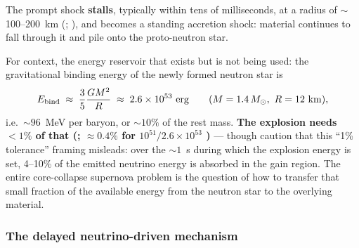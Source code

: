 The prompt shock \textbf{stalls}, typically within tens of milliseconds, at a
radius of $\sim$100--200~km (\citealt{janka2007}; \citealt{burrows2021}), and
becomes a standing accretion shock: material continues to fall through it and
pile onto the proto-neutron star.

For context, the energy reservoir that exists but is not being used: the
gravitational binding energy of the newly formed neutron star is
%
\begin{equation}
E_{\mathrm{bind}} \;\approx\; \frac{3}{5}\frac{GM^{2}}{R} \;\approx\; 2.6\times10^{53}\ \mathrm{erg}
\qquad (M = 1.4\,M_{\odot},\ R = 12\ \mathrm{km}),
\label{eq:ebind}
\end{equation}
%
i.e.\ $\sim 96$~MeV per baryon, or $\sim 10\%$ of the rest mass.
 \textbf{The explosion needs $< 1\%$ of that (\citealt{janka2007};
$\approx 0.4\%$ for $10^{51}/2.6 \times 10^{53}$ \derivedhere)} --- though
\citet{burrows2021} caution that this ``1\% tolerance'' framing misleads: over
the $\sim 1$~s during which the explosion energy is set, 4--10\% of the emitted
neutrino energy is absorbed in the gain region. The entire core-collapse
supernova problem is the question of how to transfer that small fraction of
the available energy from the neutron star to the overlying material.

\subsubsection{The delayed neutrino-driven mechanism}
\label{sec:delayed}

